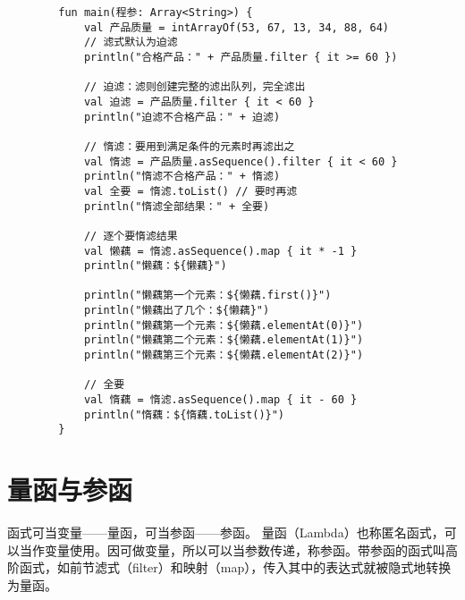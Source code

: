     \begin{verbatim}
        fun main(程参: Array<String>) {
            val 产品质量 = intArrayOf(53, 67, 13, 34, 88, 64)
            // 滤式默认为迫滤
            println("合格产品：" + 产品质量.filter { it >= 60 })

            // 迫滤：滤则创建完整的滤出队列，完全滤出
            val 迫滤 = 产品质量.filter { it < 60 }
            println("迫滤不合格产品：" + 迫滤)

            // 惰滤：要用到满足条件的元素时再滤出之
            val 惰滤 = 产品质量.asSequence().filter { it < 60 }
            println("惰滤不合格产品：" + 惰滤)
            val 全要 = 惰滤.toList() // 要时再滤
            println("惰滤全部结果：" + 全要)

            // 逐个要惰滤结果
            val 懒藕 = 惰滤.asSequence().map { it * -1 }
            println("懒藕：${懒藕}")

            println("懒藕第一个元素：${懒藕.first()}")
            println("懒藕出了几个：${懒藕}")
            println("懒藕第一个元素：${懒藕.elementAt(0)}")
            println("懒藕第二个元素：${懒藕.elementAt(1)}")
            println("懒藕第三个元素：${懒藕.elementAt(2)}")

            // 全要
            val 惰藕 = 惰滤.asSequence().map { it - 60 }
            println("惰藕：${惰藕.toList()}")
        }
    \end{verbatim}

\section{量函与参函}
函式可当变量——量函，可当参函——参函。
量函（Lambda）也称匿名函式，可以当作变量使用。因可做变量，所以可以当参数传递，称参函。带参函的函式叫高阶函式，如前节滤式（filter）和映射（map），传入其中的表达式就被隐式地转换为量函。

